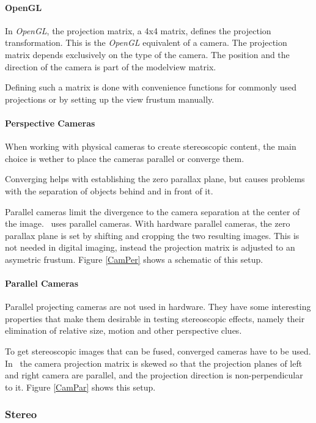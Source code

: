 \paragraph{OpenGL}
In \textit{OpenGL}, the projection matrix, a 4x4 matrix, defines the projection transformation.
This is the \textit{OpenGL} equivalent of a camera.
The projection matrix depends exclusively on the type of the camera.
The position and the direction of the camera is part of the modelview matrix.

Defining such a matrix is done with convenience functions for commonly used projections or by setting up the view frustum manually.

\paragraph{Perspective Cameras}
When working with physical cameras to create stereoscopic content, the main choice is wether to place the cameras parallel or converge them.

Converging helps with establishing the zero parallax plane, but causes problems with the separation of objects behind and in front of it.

Parallel cameras limit the divergence to the camera separation at the center of the image.
\ER\ uses parallel cameras.
With hardware parallel cameras, the zero parallax plane is set by shifting and cropping the two resulting images.
This is not needed in digital imaging, instead the projection matrix is adjusted to an asymetric frustum.
Figure \ref{CamPer} shows a schematic of this setup.

\paragraph{Parallel Cameras}
Parallel projecting cameras are not used in hardware.
They have some interesting properties that make them desirable in testing stereoscopic effects,
namely their elimination of relative size, motion and other perspective clues.

To get stereoscopic images that can be fused, converged cameras have to be used.
In \ER\ the camera projection matrix is skewed so that the projection planes of left and right camera are parallel, and the projection direction is non-perpendicular to it.
Figure \ref{CamPar} shows this setup.


\subsubsection{Stereo\label{RendStereo}}
